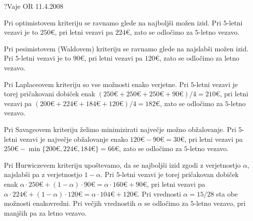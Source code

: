 \begin{naloga}{?}{Vaje OR 11.4.2008}
\begin{odgovor}
Pri optimistovem kriteriju se ravnamo glede na najboljši možen izid.
Pri $5$-letni vezavi je to $250 €$, pri letni vezavi pa $224 €$,
zato se odločimo za $5$-letno vezavo.

Pri pesimistovem (Waldovem) kriteriju se ravnamo glede na najslabši možen izid.
Pri $5$-letni vezavi je to $90 €$, pri letni vezavi pa $120 €$,
zato se odločimo za letno vezavo.

Pri Laplaceovem kriteriju so vse možnosti enako verjetne.
Pri $5$-letni vezavi je torej pričakovani dobiček enak
$(250 € + 250 € + 250 € + 90 €)/4 = 210 €$,
pri letni vezavi pa $(200 € + 224 € + 184 € + 120 €)/4 = 182 €$,
zato se odločimo za $5$-letno vezavo.

Pri Savageovem kriteriju želimo minimizirati največje možno obžalovanje.
Pri $5$-letni vezavi je največje obžalovanje enako $120 € - 90 € = 30 €$,
pri letni vezavi pa $250 € - \min\{200€, 224€, 184€\} = 66 €$,
zato se odločimo za $5$-letno vezavo.

Pri Hurwiczevem kriteriju upoštevamo,
da se najboljši izid zgodi z ve\-rjet\-nost\-jo $\alpha$,
najslabši pa z verjetnostjo $1 - \alpha$.
Pri $5$-letni vezavi je torej pričakovan dobiček enak
$\alpha \cdot 250 € + (1 - \alpha) \cdot 90 € = \alpha \cdot 160 € + 90 €$,
pri letni vezavi pa
$\alpha \cdot 224 € + (1 - \alpha) \cdot 120 € = \alpha \cdot 104 € + 120 €$.
Pri vrednosti $\alpha = 15/28$ sta obe možnosti enakovredni.
Pri večjih vrednostih $\alpha$ se odločimo za $5$-letno vezavo,
pri manjših pa za letno vezavo.
\end{odgovor}
\end{naloga}


